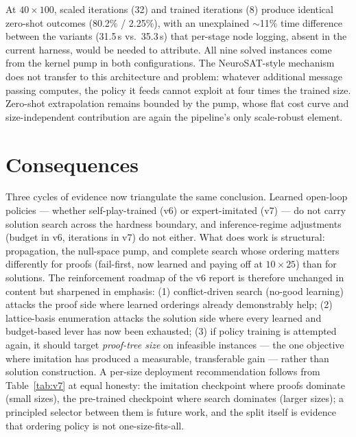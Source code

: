 \documentclass[12pt]{article}
\begin{document}
At $40 \times 100$, scaled iterations (32) and trained iterations (8) produce identical zero-shot outcomes (80.2\% / 2.25\%), with an unexplained $\sim$11\% time difference between the variants (31.5\,s vs.\ 35.3\,s) that per-stage node logging, absent in the current harness, would be needed to attribute. All nine solved instances come from the kernel pump in both configurations. The NeuroSAT-style mechanism \citep{selsam2019learning} does not transfer to this architecture and problem: whatever additional message passing computes, the policy it feeds cannot exploit at four times the trained size. Zero-shot extrapolation remains bounded by the pump, whose flat cost curve and size-independent contribution are again the pipeline's only scale-robust element.

\section{Consequences}

Three cycles of evidence now triangulate the same conclusion. Learned open-loop policies --- whether self-play-trained (v6) or expert-imitated (v7) --- do not carry solution search across the hardness boundary, and inference-regime adjustments (budget in v6, iterations in v7) do not either. What does work is structural: propagation, the null-space pump, and complete search whose ordering matters differently for proofs (fail-first, now learned and paying off at $10 \times 25$) than for solutions. The reinforcement roadmap of the v6 report is therefore unchanged in content but sharpened in emphasis: (1) conflict-driven search (no-good learning) attacks the proof side where learned orderings already demonstrably help; (2) lattice-basis enumeration attacks the solution side where every learned and budget-based lever has now been exhausted; (3) if policy training is attempted again, it should target \emph{proof-tree size} on infeasible instances --- the one objective where imitation has produced a measurable, transferable gain --- rather than solution construction. A per-size deployment recommendation follows from Table~\ref{tab:v7} at equal honesty: the imitation checkpoint where proofs dominate (small sizes), the pre-trained checkpoint where search dominates (larger sizes); a principled selector between them is future work, and the split itself is evidence that ordering policy is not one-size-fits-all.
\end{document}
